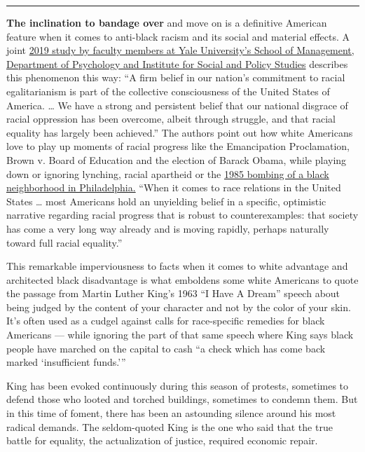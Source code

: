 \begin{center}\rule{0.5\linewidth}{\linethickness}\end{center}

\textbf{The inclination to bandage over} and move on is a definitive
American feature when it comes to anti-black racism and its social and
material effects. A joint
\href{https://journals.sagepub.com/doi/full/10.1177/1745691619863049}{2019
study by faculty members at Yale University's School of Management,
Department of Psychology and Institute for Social and Policy Studies}
describes this phenomenon this way: ``A firm belief in our nation's
commitment to racial egalitarianism is part of the collective
consciousness of the United States of America. \ldots{} We have a strong
and persistent belief that our national disgrace of racial oppression
has been overcome, albeit through struggle, and that racial equality has
largely been achieved.'' The authors point out how white Americans love
to play up moments of racial progress like the Emancipation
Proclamation, Brown v. Board of Education and the election of Barack
Obama, while playing down or ignoring lynching, racial apartheid or the
\href{https://www.theguardian.com/us-news/2020/may/10/move-1985-bombing-reconciliation-philadelphia}{1985
bombing of a black neighborhood in Philadelphia.} ``When it comes to
race relations in the United States \ldots{} most Americans hold an
unyielding belief in a specific, optimistic narrative regarding racial
progress that is robust to counterexamples: that society has come a very
long way already and is moving rapidly, perhaps naturally toward full
racial equality.''

This remarkable imperviousness to facts when it comes to white advantage
and architected black disadvantage is what emboldens some white
Americans to quote the passage from Martin Luther King's 1963 ``I Have A
Dream'' speech about being judged by the content of your character and
not by the color of your skin. It's often used as a cudgel against calls
for race-specific remedies for black Americans --- while ignoring the
part of that same speech where King says black people have marched on
the capital to cash ``a check which has come back marked `insufficient
funds.'''

King has been evoked continuously during this season of protests,
sometimes to defend those who looted and torched buildings, sometimes to
condemn them. But in this time of foment, there has been an astounding
silence around his most radical demands. The seldom-quoted King is the
one who said that the true battle for equality, the actualization of
justice, required economic repair.

